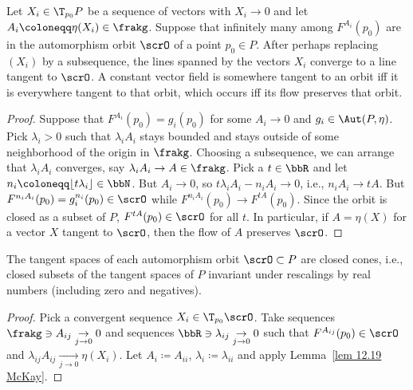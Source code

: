 \begin{lem}\label{lem 12.19 McKay}
    Let $X_i\in \T_{p_0}P$ be a sequence of vectors with $X_i\to 0$ and let $A_i\coloneqq \eta(X_i)\in\frakg$. Suppose that infinitely many among $F^{A_i}(p_0)$ are in the automorphism orbit $\scrO$ of a point $p_0\in P$. After perhaps replacing $(X_i)$ by a subsequence, the lines spanned by the vectors $X_i$ converge to a line tangent to $\scrO$. A constant vector field is somewhere tangent to an orbit iff it is everywhere tangent to that orbit, which occurs iff its flow preserves that orbit.
\end{lem}
\begin{proof}
    Suppose that $F^{A_i}(p_0)=g_i(p_0)$ for some $A_i\to 0$ and $g_i\in \Aut(P,\eta)$. Pick $\lambda_i>0$ such that $\lambda_i A_i$ stays bounded and stays outside of some neighborhood of the origin in $\frakg$. Choosing a subsequence, we can arrange that $\lambda_i A_i$ converges, say $\lambda_i A_i\to A\in\frakg$. Pick a $t\in \bbR$ and let $n_i\coloneqq \lfloor t\lambda_i\rfloor\in\bbN$. But $A_i\to 0$, so $t\lambda_i A_i-n_i A_i\to 0$, i.e., $n_i A_i\to tA$. But $F^{n_iA_i}(p_0)=g_i^{n_i}(p_0)\in\scrO$ while $F^{n_iA_i}(p_0)\to F^{tA}(p_0)$. Since the orbit is closed as a subset of $P$, $F^{tA}(p_0)\in\scrO$ for all $t$. In particular, if $A=\eta(X)$ for a vector $X$ tangent to $\scrO$, then the flow of $A$ preserves $\scrO$.
\end{proof}

\begin{lem}
    The tangent spaces of each automorphism orbit $\scrO\subset P$ are closed cones, i.e., closed subsets of the tangent spaces of $P$ invariant under rescalings by real numbers (including zero and negatives).
\end{lem}
\begin{proof}
    Pick a convergent sequence $X_i\in \T_{p_0}\scrO$. Take sequences $\frakg\ni A_{ij}\underset{j\to 0}{\to} 0$ and sequences $\bbR\ni\lambda_{ij}\underset{j\to 0}{\to} 0$ such that $F^{A_{ij}}(p_0)\in\scrO$ and $\lambda_{ij}A_{ij}\underset{j\to 0}{\to} \eta(X_i)$. Let $A_i\coloneqq A_{ii}$, $\lambda_i\coloneqq \lambda_{ii}$ and apply Lemma~\ref{lem 12.19 McKay}.
\end{proof}

